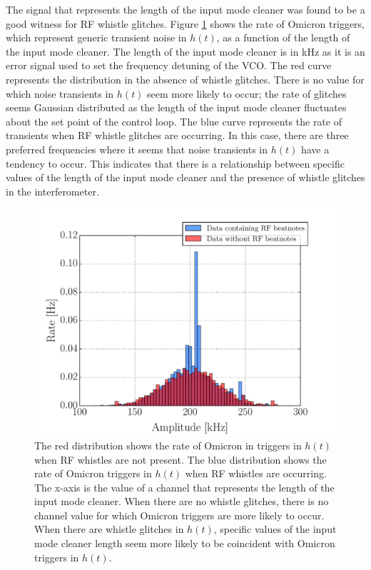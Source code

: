 The signal that represents the length of the input mode cleaner was found to 
be a good witness for RF whistle glitches. Figure \ref{fig:darm-whistle-hist} 
shows the rate of Omicron triggers, which represent generic transient noise in 
$h(t)$, as a function of the length of the input mode cleaner. The length of 
the input mode cleaner is in kHz as it is an error signal used to set the 
frequency detuning of the VCO. The red curve represents the distribution in 
the absence of whistle glitches. There is no value for which noise transients in 
$h(t)$ seem more likely to occur; the rate of glitches seems Gaussian distributed 
as the length of the input mode cleaner fluctuates about the set point of the 
control loop. The blue curve represents the rate of transients 
when RF whistle glitches are occurring. In this case, there are three preferred 
frequencies where it seems that noise transients in $h(t)$ have a tendency to 
occur. This indicates that there is a relationship between specific values of 
the length of the input mode cleaner and the presence of whistle glitches in the 
interferometer. 

\begin{figure}[ht!]%
\includegraphics[width=\textwidth]{figures/detchar/Rate_Histogram_Whistles_LLO}
\caption[DARM glitch histograms with and without RF whistles]{The red distribution %
         shows the rate of Omicron in triggers in $h(t)$ when RF whistles are not %
         present. The blue distribution shows the rate of Omicron triggers in $h(t)$ %
         when RF whistles are occurring. The x-axis is the value of a channel that %
         represents the length of the input mode cleaner. When there are no whistle %
         glitches, there is no channel value for which Omicron triggers are more %
         likely to occur. When there are whistle glitches in $h(t)$, specific %
         values of the input mode cleaner length seem more likely to be coincident %
         with Omicron triggers in $h(t)$.}
\label{fig:darm-whistle-hist}
\end{figure}

